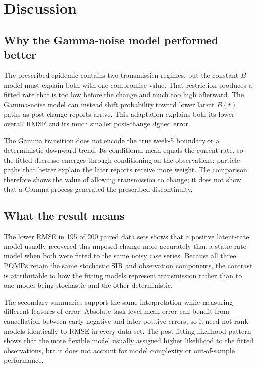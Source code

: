 \section{Discussion}
\label{sec:discussion}

\subsection{Why the Gamma-noise model performed better}

The prescribed epidemic contains two transmission regimes, but the
constant-\(B\) model must explain both with one compromise value.  That
restriction produces a fitted rate that is too low before the change and much
too high afterward.  The Gamma-noise model can instead shift probability
toward lower latent \(B(t)\) paths as post-change reports arrive.  This
adaptation explains both its lower overall RMSE and its much smaller
post-change signed error.

The Gamma transition does not encode the true week-5 boundary or a
deterministic downward trend.  Its conditional mean equals the current rate,
so the fitted decrease emerges through conditioning on the observations:
particle paths that better explain the later reports receive more weight.
The comparison therefore shows the value of allowing transmission to change;
it does not show that a Gamma process generated the prescribed discontinuity.

\subsection{What the result means}

The lower RMSE in 195 of 200 paired data sets shows that a positive latent-rate
model usually recovered this imposed change more accurately than a static-rate
model when both were fitted to the same noisy case series.  Because all three POMPs
retain the same stochastic SIR and observation components, the contrast is
attributable to how the fitting models represent transmission rather than to
one model being stochastic and the other deterministic.

The secondary summaries support the same interpretation while measuring
different features of error.  Absolute task-level mean error can benefit from
cancellation between early negative and later positive errors, so it need not
rank models identically to RMSE in every data set.  The post-fitting likelihood
pattern shows that the more flexible model usually assigned higher likelihood
to the fitted observations, but it does not account for model complexity or
out-of-sample performance.


